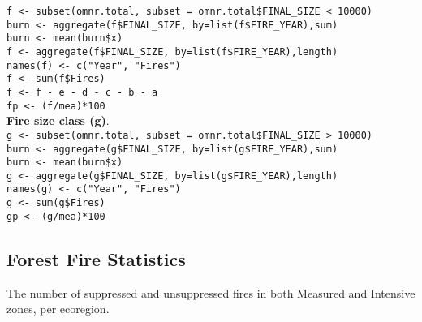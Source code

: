 \begin{spacing}{1.5}
\noindent \texttt{f <- subset(omnr.total, subset = omnr.total\$FINAL\_SIZE < 10000)} \\

\noindent \texttt{burn <- aggregate(f\$FINAL\_SIZE, by=list(f\$FIRE\_YEAR),sum)} \\

\noindent \texttt{burn <- mean(burn\$x)} \\
                     
\noindent \texttt{f <- aggregate(f\$FINAL\_SIZE, by=list(f\$FIRE\_YEAR),length)} \\

\noindent \texttt{names(f) <- c("Year", "Fires")} \\

\noindent \texttt{f <- sum(f\$Fires)} \\

\noindent \texttt{f <- f - e - d - c - b - a} \\

\noindent \texttt{fp <- (f/mea)*100} \\

\noindent \textbf{Fire size class (g)}. \\

\noindent \texttt{g <- subset(omnr.total, subset = omnr.total\$FINAL\_SIZE > 10000)} \\

\noindent \texttt{burn <- aggregate(g\$FINAL\_SIZE, by=list(g\$FIRE\_YEAR),sum)} \\

\noindent \texttt{burn <- mean(burn\$x)} \\
               
\noindent \texttt{g <- aggregate(g\$FINAL\_SIZE, by=list(g\$FIRE\_YEAR),length)} \\

\noindent \texttt{names(g) <- c("Year", "Fires")} \\

\noindent \texttt{g <- sum(g\$Fires)} \\

\noindent \texttt{gp <- (g/mea)*100}

\subsection{Forest Fire Statistics}
The number of suppressed and unsuppressed fires in both Measured and Intensive zones, per ecoregion. \\


\end{spacing}
